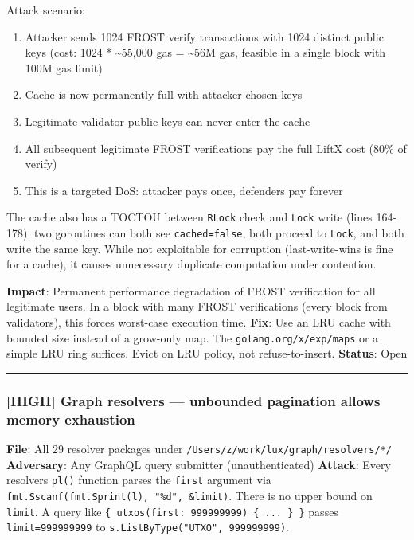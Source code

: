 \documentclass[
]{article}
\providecommand{\tightlist}{%
  \setlength{\itemsep}{0pt}\setlength{\parskip}{0pt}}
\begin{document}
Attack scenario:

\begin{enumerate}
\def\labelenumi{\arabic{enumi}.}
\tightlist
\item
  Attacker sends 1024 FROST verify transactions with 1024 distinct
  public keys (cost: 1024 * \textasciitilde55,000 gas =
  \textasciitilde56M gas, feasible in a single block with 100M gas
  limit)
\item
  Cache is now permanently full with attacker-chosen keys
\item
  Legitimate validator public keys can never enter the cache
\item
  All subsequent legitimate FROST verifications pay the full LiftX cost
  (80\% of verify)
\item
  This is a targeted DoS: attacker pays once, defenders pay forever
\end{enumerate}

The cache also has a TOCTOU between \texttt{RLock} check and
\texttt{Lock} write (lines 164-178): two goroutines can both see
\texttt{cached=false}, both proceed to \texttt{Lock}, and both write the
same key. While not exploitable for corruption (last-write-wins is fine
for a cache), it causes unnecessary duplicate computation under
contention.

\textbf{Impact}: Permanent performance degradation of FROST verification
for all legitimate users. In a block with many FROST verifications
(every block from validators), this forces worst-case execution time.
\textbf{Fix}: Use an LRU cache with bounded size instead of a grow-only
map. The \texttt{golang.org/x/exp/maps} or a simple LRU ring suffices.
Evict on LRU policy, not refuse-to-insert. \textbf{Status}: Open

\begin{center}\rule{0.5\linewidth}{0.5pt}\end{center}

\subsubsection{{[}HIGH{]} Graph resolvers --- unbounded pagination
allows memory
exhaustion}\label{high-graph-resolvers--unbounded-pagination-allows-memory-exhaustion}

\textbf{File}: All 29 resolver packages under
\texttt{/Users/z/work/lux/graph/resolvers/*/} \textbf{Adversary}: Any
GraphQL query submitter (unauthenticated) \textbf{Attack}: Every
resolver\textquotesingle s \texttt{pl()} function parses the
\texttt{first} argument via
\texttt{fmt.Sscanf(fmt.Sprint(l),\ "\%d",\ \&limit)}. There is no upper
bound on \texttt{limit}. A query like
\texttt{\{\ utxos(first:\ 999999999)\ \{\ ...\ \}\ \}} passes
\texttt{limit=999999999} to \texttt{s.ListByType("UTXO",\ 999999999)}.
\end{document}
